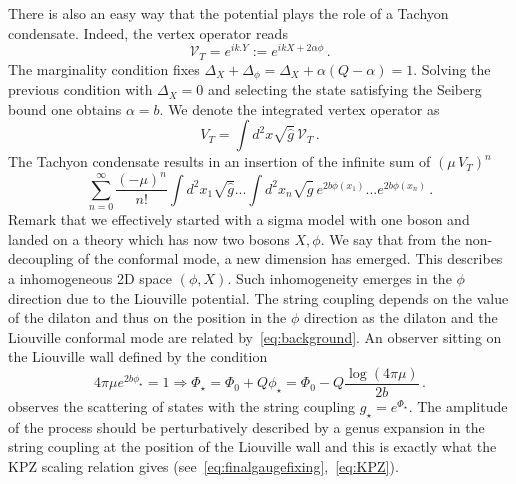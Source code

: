 \documentclass[a4paper]{article}
\begin{document}
There is also an easy way that the potential plays the role of a Tachyon condensate. Indeed, the vertex operator reads
\begin{equation}
  \mathcal{V}_{T} = e^{i k.Y} := e^{ikX +2\alpha \phi}\,.
\end{equation}
The marginality condition fixes $\Delta_X + \Delta_\phi = \Delta_X + \alpha(Q-\alpha)=1$. Solving the previous condition with $\Delta_X=0$ and selecting the state satisfying the Seiberg bound one obtains $\alpha = b$. We denote the integrated vertex operator as
\begin{equation}
  V_{T} = \int d^2x \sqrt{\hat{g}} \,\mathcal{V}_T\,.
\end{equation}
The Tachyon condensate results in an insertion of the infinite sum of $(\mu \,V_T)^n$
\begin{equation}
  \sum_{n=0}^{\infty}\frac{(-\mu)^n}{n!} \int d^2x_1 \sqrt{\hat{g}} ... \int d^2x_n \sqrt{\hat{g}} \,e^{2 b\phi(x_1)}...e^{2 b\phi(x_n)}\,.
\end{equation}
Remark that we effectively started with a sigma model with one boson and landed on a theory which has now two bosons $X,\phi$. We say that from the non-decoupling of the conformal mode, a new dimension has emerged. This describes a inhomogeneous 2D space $(\phi,X)$. Such inhomogeneity emerges in the $\phi$ direction due to the Liouville potential. The string coupling depends on the value of the dilaton and thus on the position in the $\phi$ direction as the dilaton and the Liouville conformal mode are related by~\eqref{eq:background}. An observer sitting on the Liouville wall defined by the condition
\begin{equation}\label{eq:relationLiouvillewallcosmologicalconstant}
  4\pi\mu e^{2b\phi_\star} = 1 \Rightarrow \Phi_\star = \Phi_0 + Q\phi_\star = \Phi_0 -Q\frac{\log(4\pi\mu)}{2b}\,.
\end{equation}
observes the scattering of states with the string coupling $g_\star = e^{\Phi_\star}$. The amplitude of the process should be perturbatively described by a genus expansion in the string coupling at the position of the Liouville wall and this is exactly what the KPZ scaling relation gives (see~\eqref{eq:finalgaugefixing},~\eqref{eq:KPZ}).
\end{document}
